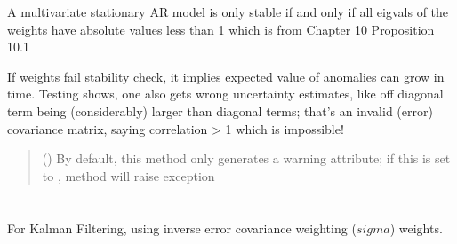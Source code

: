 \documentclass[letterpaper,10pt,english]{sphinxmanual}
\begin{document}
\begin{fulllineitems}
\begin{fulllineitems}
\begin{fulllineitems}
\begin{quote}
\begin{description}
\end{description}\end{quote}

\end{fulllineitems}


\end{fulllineitems}


\begin{fulllineitems}
\label{\detokenize{kalman:glomar_gridding.autoregressive_kalman.Autoregressive1ForecastVector.var_stability_check}}
\pysigstartsignatures
\pysiglinewithargsret
{}
{}
{}
\pysigstopsignatures
\sphinxAtStartPar
A multivariate stationary AR model is only stable if and only
if all eigvals of the weights have absolute values less than 1
which is from
Chapter 10 Proposition 10.1

\sphinxAtStartPar
If weights fail stability check, it implies expected value
of anomalies can grow in time.
Testing shows, one also gets wrong uncertainty
estimates, like off diagonal term being (considerably) larger than
diagonal terms; that’s an invalid (error) covariance matrix, saying
correlation \textgreater{} 1 which is impossible!
\begin{quote}\begin{description}
\sphinxAtStartPar
{} () \textendash{} By default, this method only generates a warning attribute;
if this is set to , method will raise exception

\end{description}\end{quote}

\end{fulllineitems}


\end{fulllineitems}



\section{}
\label{\detokenize{kalman:autoregressive-kalman-inv-sigma-wgts}}
\sphinxAtStartPar
For Kalman Filtering, using inverse error covariance weighting (\(sigma\)) weights.
\end{document}
